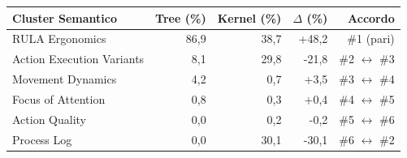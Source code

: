 \begin{tabular*}{\linewidth}{@{}l@{\extracolsep{\fill}}rrrr@{}}
\toprule
\textbf{Cluster Semantico} & \textbf{Tree (\%)} & \textbf{Kernel (\%)} & \textbf{$\Delta$ (\%)} & \textbf{Accordo} \\
\midrule
RULA Ergonomics & 86{,}9 & 38{,}7 & +48{,}2 & \#1 (pari) \\
Action Execution Variants & 8{,}1 & 29{,}8 & -21{,}8 & \#2 $\leftrightarrow$ \#3 \\
Movement Dynamics & 4{,}2 & 0{,}7 & +3{,}5 & \#3 $\leftrightarrow$ \#4 \\
Focus of Attention & 0{,}8 & 0{,}3 & +0{,}4 & \#4 $\leftrightarrow$ \#5 \\
Action Quality & 0{,}0 & 0{,}2 & -0{,}2 & \#5 $\leftrightarrow$ \#6 \\
Process Log & 0{,}0 & 30{,}1 & -30{,}1 & \#6 $\leftrightarrow$ \#2 \\
\bottomrule
\end{tabular*}
